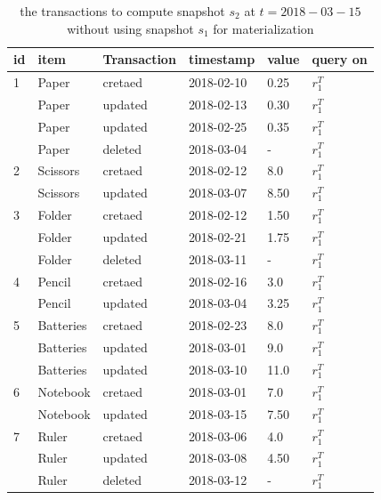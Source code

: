 \begin{center}
\begin{table}
	\centering
	\caption{the transactions to compute snapshot $s_2$ at $t = 2018-03-15$ without using snapshot $s_1$ for materialization}
	\label{table:transactions_nonmaterialized}
	\begin{tabular}{p{1cm}p{2cm}p{2cm}p{3cm}p{2cm}p{2cm}}
		\hline
		id & item & Transaction  &timestamp & value  &query on\\ \hline
		1 & Paper & cretaed & 2018-02-10 & 0.25 & $r_1^T$ \\
		  & Paper & updated & 2018-02-13 & 0.30 & $r_1^T$ \\
		  & Paper & updated & 2018-02-25 & 0.35 & $r_1^T$ \\
		  & Paper & deleted & 2018-03-04 & - & $r_1^T$ \\ \hline
		2 & Scissors & cretaed & 2018-02-12 & 8.0 & $r_1^T$ \\
		  & Scissors & updated & 2018-03-07 & 8.50 & $r_1^T$ \\ \hline
		3 & Folder & cretaed & 2018-02-12 & 1.50 & $r_1^T$ \\
		  & Folder & updated & 2018-02-21 & 1.75 & $r_1^T$ \\
		  & Folder & deleted & 2018-03-11 & - & $r_1^T$ \\ \hline
	  	4 & Pencil & cretaed & 2018-02-16 & 3.0 & $r_1^T$ \\
		  & Pencil & updated & 2018-03-04 & 3.25 & $r_1^T$ \\ \hline
  	  	5 & Batteries & cretaed & 2018-02-23 & 8.0 & $r_1^T$ \\
		  & Batteries & updated & 2018-03-01 & 9.0 & $r_1^T$ \\
		  & Batteries & updated & 2018-03-10 & 11.0 & $r_1^T$ \\ \hline
		6 & Notebook & cretaed & 2018-03-01 & 7.0 & $r_1^T$ \\ 
		  & Notebook & updated & 2018-03-15 & 7.50 & $r_1^T$ \\ \hline
		7 & Ruler & cretaed & 2018-03-06 & 4.0 & $r_1^T$ \\
		  & Ruler & updated & 2018-03-08 & 4.50 & $r_1^T$ \\
		  & Ruler & deleted & 2018-03-12 & - & $r_1^T$ \\ \hline

	\end{tabular}
\end{table}
\end{center}


